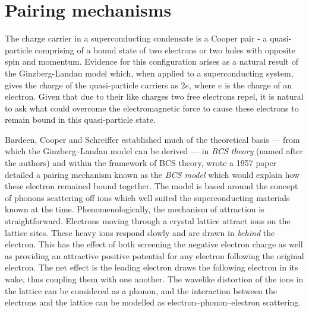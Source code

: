 

\section{Pairing mechanisms}
\label{Sec:Intro:Nesting}

The charge carrier in a superconducting condensate is a Cooper pair - a quasi-particle comprising of a bound state of two electrons or two holes with opposite spin and momentum. Evidence for this configuration arises as a natural result of the Ginzberg-Landau model which, when applied to a superconducting system, gives the charge of the quasi-particle carriers as $2e$, where $e$ is the charge of an electron. Given that due to their like charges two free electrons repel, it is natural to ask what could overcome the electromagnetic force to cause these electrons to remain bound in this quasi-particle state.

Bardeen, Cooper and Schreiffer established much of the theoretical basis --- from which the Ginzberg--Landau model can be derived --- in \textit{BCS theory} (named after the authors) and within the framework of BCS theory, wrote a 1957 paper\cite{Bardeen1957} detailed a pairing mechanism known as the \textit{BCS model} which would explain how these electron remained bound together. The model is based around the concept of phonons scattering off ions which well suited the superconducting materials known at the time. Phenomenologically, the mechanism of attraction is straightforward. Electrons moving through a crystal lattice attract ions on the lattice sites. These heavy ions respond slowly and are drawn in \textit{behind} the electron. This has the effect of both screening the negative electron charge as well as providing an attractive positive potential for any electron following the original electron. The net effect is the leading electron draws the following electron in its wake, thus coupling them with one another. The wavelike distortion of the ions in the lattice can be considered as a phonon, and the interaction between the electrons and the lattice can be modelled as electron--phonon--electron scattering.

